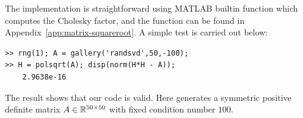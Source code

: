 \documentclass[12pt]{article}
\begin{document}
The implementation is straightforward using MATLAB builtin function  which computes the Cholesky factor, and the function  can be found in Appendix~\ref{app:matrix-squareroot}. A simple test is carried out below:
\begin{lstlisting}
>> rng(1); A = gallery('randsvd',50,-100); 
>> H = polsqrt(A); disp(norm(H*H - A));
    2.9638e-16
\end{lstlisting}
The result shows that our code is valid. Here  generates a symmetric positive definite matrix $A\in\mathbb{R}^{50\times 50}$ with fixed condition number $100$.




\newpage 


\newpage 

\end{document}

